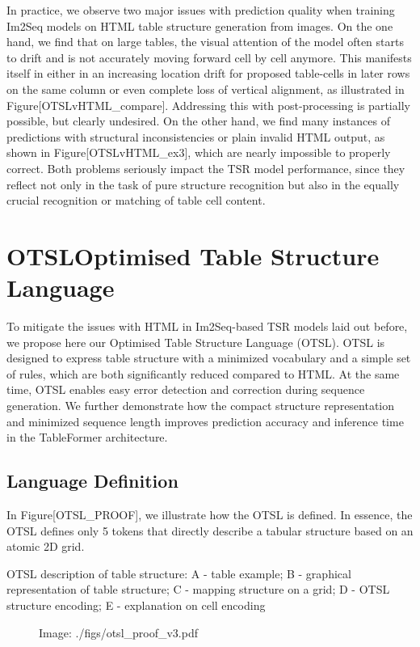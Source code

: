 \documentclass[11pt,a4paper]{article}
\begin{document}
In practice, we observe two major issues with prediction quality when training Im2Seq models on HTML table structure generation from images.
On the one hand, we find that on large tables, the visual attention of the model often starts to drift and is not accurately moving forward cell by cell anymore. This manifests itself in either in an increasing location drift for proposed table-cells in later rows on the same column or even complete loss of vertical alignment, as illustrated in Figure[OTSLvHTML\_compare]. Addressing this with post-processing is partially possible, but clearly undesired. On the other hand, we find many instances of predictions with structural inconsistencies or plain invalid HTML output, as shown in Figure[OTSLvHTML\_ex3], which are nearly impossible to properly correct.
Both problems seriously impact the TSR model performance, since they reflect not only in the task of pure structure recognition but also in the equally crucial recognition or matching of table cell content.

\section{OTSLOptimised Table Structure Language}

To mitigate the issues with HTML in Im2Seq-based TSR models laid out before, we propose here our Optimised Table Structure Language (OTSL). OTSL is designed to express table structure with a minimized vocabulary and a simple set of rules, which are both significantly reduced compared to HTML. At the same time, OTSL enables easy error detection and correction during sequence generation. We further demonstrate how the compact structure representation and minimized sequence length improves prediction accuracy and inference time in the TableFormer architecture.

\subsection{Language Definition}

In Figure[OTSL\_PROOF], we illustrate how the OTSL is defined. In essence, the OTSL defines only 5 tokens that directly describe a tabular structure based on an atomic 2D grid.

OTSL description of table structure: A - table example; B - graphical representation of table structure; C - mapping structure on a grid; D - OTSL structure encoding; E - explanation on cell encoding

\begin{figure}[h]
\caption{Image: ./figs/otsl\_proof\_v3.pdf}
\end{figure}
\end{document}
